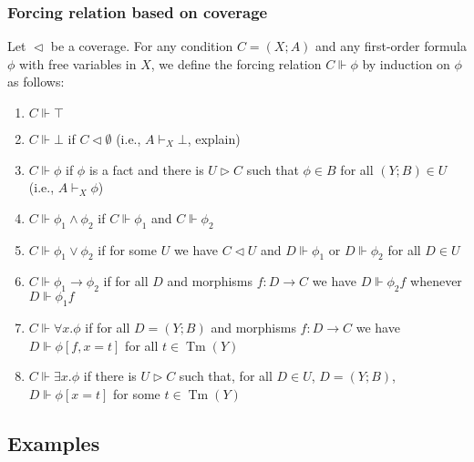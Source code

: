 \documentclass[handout,11pt]{beamer}
\newcommand{\es}{\emptyset}
\newcommand{\covd}{\mathrel{\vartriangleleft}}
\newcommand{\covs}{\mathrel{\vartriangleright}}
\DeclareMathOperator{\Tm}{Tm}
\begin{document}
\begin{frame}
\frametitle{Forcing relation based on coverage}

Let ${\covd}$ be a coverage. %
For any condition $C=(X;A)$ and any first-order formula
$\phi$ with free variables in $X$, we define the forcing relation
$C\Vdash\phi$ by induction on $\phi$ as follows:
\begin{enumerate}
\item $C\Vdash\top$

\item $C\Vdash\bot$ if $C\covd\es$ (i.e., $A\vdash_X \bot$, explain)

\item $C\Vdash\phi$ if $\phi$ is a fact and there is $U \covs C$ such that
$\phi\in B$ for all $(Y;B)\in U$ (i.e., $A\vdash_X \phi$)

\item $C\Vdash\phi_1 \land \phi_2$ if $C\Vdash\phi_1$ and $C\Vdash\phi_2$

\item $C\Vdash\phi_1 \lor \phi_2$ if for some $U$ we have
$C\covd U$ and $D\Vdash\phi_1$ or $D\Vdash\phi_2$ for all $D\in U$

\item $C\Vdash\phi_1 \to \phi_2$ if for all $D$ and morphisms $f:D\to C$
we have $D\Vdash\phi_2f$ whenever $D\Vdash\phi_1f$

\item $C\Vdash\forall x.\phi$ if for all $D=(Y;B)$ and 
morphisms $f:D\to C$ we have 
 $D\Vdash\phi [f,x=t]$ for all $t\in\Tm(Y)$
 
\item $C\Vdash\exists x.\phi$ if there is $U\covs C$ such that,
for all $D\in U$, $D=(Y;B)$, $D\Vdash\phi[x=t]$ for some $t\in\Tm(Y)$

\end{enumerate}
\end{frame}

\subsection{Examples}
\end{document}
